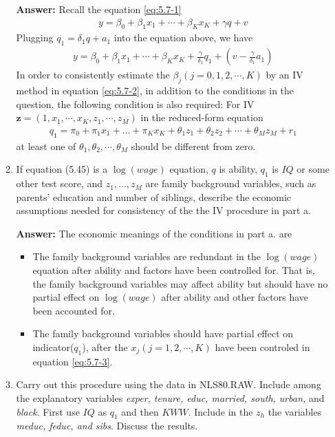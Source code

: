 \documentclass[UTF8]{article} %
\begin{document}
\begin{enumerate}
\begin{enumerate}
        \textbf{Answer:} Recall the equation \eqref{eq:5.7-1}
        \begin{gather}
            y=\beta_{0}+\beta_{1} x_{1}+\cdots+\beta_{K} x_{K}+\gamma q+v \tag{5.45} \label{eq:5.7-1}
        \end{gather}
        Plugging $q_{1}=\delta_{1} q+a_{1}$ into the equation above, we have
        \begin{gather}
            y=\beta_{0}+\beta_{1} x_{1}+\cdots+\beta_{K} x_{K}+\frac{\gamma}{\delta_1}q_1 + \left( v-\frac{\gamma}{\delta_1}a_1 \right) \label{eq:5.7-2}
        \end{gather}
        In order to consistently estimate the $\beta_j(j = 0,1,2,\cdots,K)$ by an IV method in equation \eqref{eq:5.7-2}, in addition to the conditions in the question, the following condition is also required: For IV $\mathbf{z}=(1,x_1,\cdots,x_K,z_1,\cdots,z_M)$ in the reduced-form equation
        \begin{gather}
            q_{1}=\pi_{0}+\pi_{1} x_{1}+\ldots+\pi_{K} x_{K}+\theta_{1} z_{1}+\theta_2 z_2 + \cdots+\theta_{M} z_{M}+r_{1} \label{eq:5.7-3}
        \end{gather}
        at least one of $\theta_1, \theta_2, \cdots, \theta_M$ should be different from zero.
        
        \item If equation (5.45) is a $\log(wage)$ equation, $q$ is ability, $q_{1}$ is $I Q$ or some other test score, and $z_{1}, \ldots, z_{M}$ are family background variables, such as parents' education and number of siblings, describe the economic assumptions needed for consistency of the the IV procedure in part a.
        
        \textbf{Answer:} The economic meanings of the conditions in part a. are
        \begin{itemize}
            \item The family background variables are redundant in the $\log(wage)$ equation after ability and factors have been controlled for. That is, the family background variables may affect ability but should have no partial effect on $\log(wage)$ after ability and other factors have been accounted for.
            \item The family background variables should have partial effect on indicator($q_1$), after the $x_j(j=1,2,\cdots,K)$ have been controled in equation \eqref{eq:5.7-3}.
        \end{itemize}
        
        \item Carry out this procedure using the data in NLS80.RAW. Include among the explanatory variables \textit{exper, tenure, educ, married, south, urban,} and \textit{black}. First use $I Q$ as $q_{1}$ and then $K W W .$ Include in the $z_{h}$ the variables \textit{meduc, feduc, and sibs}. Discuss the results.
        

\end{enumerate}
\end{enumerate}
\end{document}
